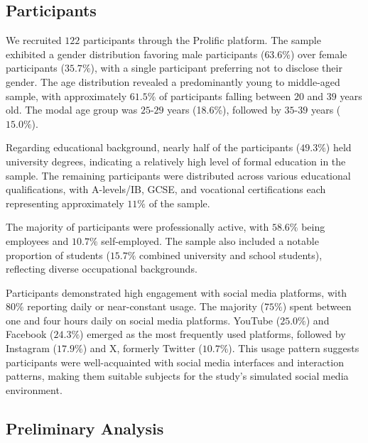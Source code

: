 \subsection{Participants}

We recruited $122$ participants through the Prolific platform. The sample exhibited a gender distribution favoring male participants ($63.6\%$) over female participants ($35.7\%$), with a single participant preferring not to disclose their gender. The age distribution revealed a predominantly young to middle-aged sample, with approximately $61.5\%$ of participants falling between $20$ and $39$ years old. The modal age group was $25$-$29$ years (18.6\%), followed by $35$-$39$ years ($15.0\%$).

Regarding educational background, nearly half of the participants ($49.3\%$) held university degrees, indicating a relatively high level of formal education in the sample. The remaining participants were distributed across various educational qualifications, with A-levels/IB, GCSE, and vocational certifications each representing approximately $11\%$ of the sample.

The majority of participants were professionally active, with $58.6\%$ being employees and $10.7\%$ self-employed. The sample also included a notable proportion of students ($15.7\%$ combined university and school students), reflecting diverse occupational backgrounds.



Participants demonstrated high engagement with social media platforms, with $80\%$ reporting daily or near-constant usage. The majority ($75\%$) spent between one and four hours daily on social media platforms. YouTube ($25.0\%$) and Facebook ($24.3\%$) emerged as the most frequently used platforms, followed by Instagram ($17.9\%$) and X, formerly Twitter ($10.7\%$). This usage pattern suggests participants were well-acquainted with social media interfaces and interaction patterns, making them suitable subjects for the study's simulated social media environment.

\subsection{Preliminary Analysis}

